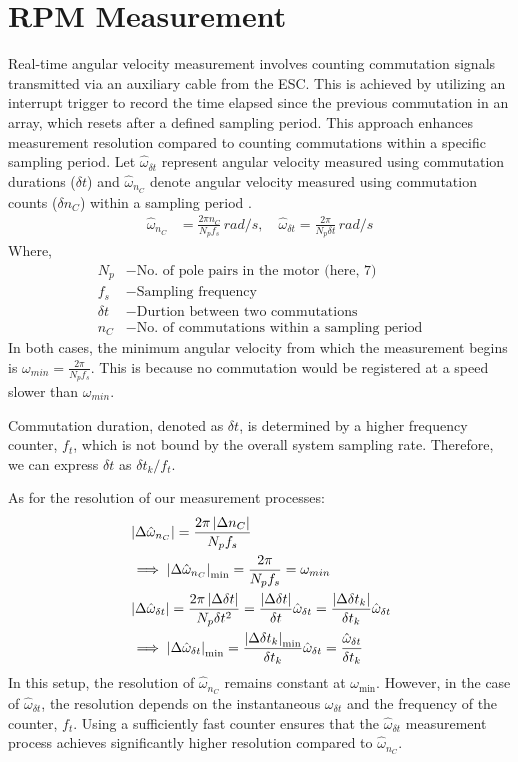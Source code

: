 \section{RPM Measurement}
Real-time angular velocity measurement involves counting commutation signals transmitted via
an auxiliary cable from the ESC. This is achieved by utilizing an interrupt
trigger to record the time elapsed since the previous commutation in an array,
which resets after a defined sampling period. This approach enhances measurement
resolution compared to counting commutations within a specific sampling period.
Let $\hat \omega_{\delta t}$ represent angular velocity measured using commutation durations
($\delta t$) and $\hat \omega_{n_C}$ denote angular velocity measured using commutation
counts ($\delta n_C$) within a sampling period \cite{PX4-autopilot-rpm}.
\begin{align}
    \hat \omega_{n_C} &= \frac{2 \pi n_C}{N_p f_s} \, rad/s, \quad
    \hat \omega_{\delta t} = \frac{2 \pi}{N_p  \delta t} \, rad/s
\end{align}
Where,
\begin{align*}
    N_p &- \text{No. of pole pairs in the motor (here, 7)}\\
    f_s &- \text{Sampling frequency}\\
    \delta t &- \text{Durtion between two commutations}\\
    n_C &- \text{No. of commutations within a sampling period}
\end{align*}
In both cases, the minimum angular velocity from which the measurement begins is $\omega_{min} = \frac{2 \pi}{N_p f_s}$. This is because no commutation would be registered at a speed slower than $\omega_{min}$.

Commutation duration, denoted as $\delta t$, is determined by a higher frequency counter, $f_t$, which is not bound by the overall system sampling rate. Therefore, we can express $\delta t$ as $\delta t_k / f_t$.

As for the resolution of our measurement processes:
\begin{align}
    &\left\lvert \Delta \hat \omega_{n_C} \right\rvert = \frac{2 \pi \left\lvert \Delta n_C \right\rvert }{N_p f_s} \\
    &\implies \left\lvert \Delta \hat \omega_{n_C} \right\rvert_{\min} =\frac{2 \pi}{N_p f_s} = \omega_{min}\\
    &\left\lvert \Delta\hat \omega_{\delta t} \right\rvert = \frac{2 \pi \left\lvert \Delta \delta t \right\rvert}{N_p  \delta t^2} = \frac{\left\lvert \Delta \delta t \right\rvert}{\delta t} \hat \omega_{\delta t} = \frac{\left\lvert \Delta \delta t_k \right\rvert}{\delta t_k} \hat \omega_{\delta t}\\
    &\implies  \left\lvert \Delta\hat \omega_{\delta t} \right\rvert_{\min} = \frac{\left\lvert \Delta \delta t_k \right\rvert_{\min}}{\delta t_k} \hat \omega_{\delta t} = \frac{\hat \omega_{\delta t}}{\delta t_k}
\end{align}
In this setup, the resolution of $\hat \omega_{n_C}$ remains constant at $\omega_{\min}$. However, in the case of $\hat \omega_{\delta t}$, the resolution depends on the instantaneous $\omega_{\delta t}$ and the frequency of the counter, $f_t$. Using a sufficiently fast counter ensures that the $\hat \omega_{\delta t}$ measurement process achieves significantly higher resolution compared to $\hat \omega_{n_C}$.

